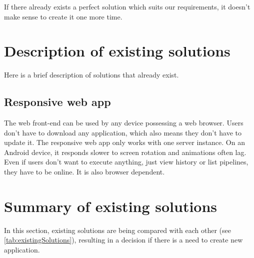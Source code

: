 If there already exists a perfect solution which suits our requirements, it doesn't make sense to create it one more time.


\section{Description of existing solutions}
Here is a brief description of solutions that already exist.

\subsection{Responsive web app}
The web front-end can be used by any device possessing a web browser.
Users don't have to download any application, which also means they don't have to update it.
The responsive web app only works with one server instance.
On an Android device, it responds slower to screen rotation and animations often lag.
Even if users don't want to execute anything, just view history or list pipelines, they have to be online.
It is also browser dependent.

\section{Summary of existing solutions}
In this section, existing solutions are being compared with each other (see \autoref{tab:existingSolutions}), resulting in a decision if there is a need to create new application.

